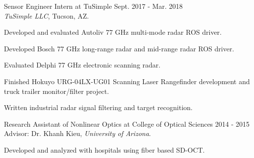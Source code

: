 \documentclass[letterpaper,9pt]{article}
\renewenvironment{itemize}{
  \begin{list}{}{
    \setlength{\topsep}{0pt}
    \setlength{\itemsep}{0pt}
    \setlength{\parsep}{0pt}
    \setlength{\partopsep}{0pt}
    \setlength{\leftmargin}{1.5em}
  }
}{\end{list}}
\begin{document}
\begin{itemize}

  \item Sensor Engineer Intern at TuSimple \hfill Sept. 2017 - Mar. 2018\\
  {\it TuSimple LLC\textsuperscript{\textregistered}}, Tucson, AZ.
  \begin{itemize}
    \item [$\bullet$] Developed and evaluated Autoliv\textsuperscript{\textregistered} 77 GHz multi-mode radar ROS driver.
    \item [$\bullet$] Developed Bosch\textsuperscript{\textregistered} 77 GHz long-range radar and mid-range radar ROS driver.
    \item [$\bullet$] Evaluated Delphi\textsuperscript{\textregistered} 77 GHz electronic scanning radar.
    \item [$\bullet$] Finished Hokuyo\textsuperscript{\textregistered} URG-04LX-UG01 Scanning Laser Rangefinder development and truck trailer monitor/filter project.
    \item [$\bullet$] Written industrial radar signal filtering and target recognition.

  \end{itemize}

  \item Research Assistant of Nonlinear Optics at College of Optical Sciences \hfill 2014 - 2015\\
  Advisor: Dr. Khanh Kieu, {\it University of Arizona}.
  \begin{itemize}
    \item [$\bullet$] Developed and analyzed with hospitals using fiber based SD-OCT.
  \end{itemize}




\end{itemize}
\end{document}
